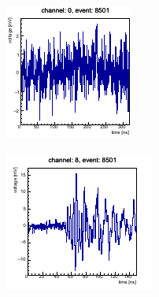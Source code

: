     \begin{figure}[h!]
        \centering
        \begin{subfigure}{.5\textwidth}
        \centering
          \includegraphics[width=.9\textwidth]{pictures/pickup_wave_sipm.pdf}
          \caption{}
          \label{fig:pickup-sipm}
        \end{subfigure}%
        \begin{subfigure}{.5\textwidth}
        \centering
          \includegraphics[width=\textwidth]{pictures/pickup_wave_pmt.pdf}

\end{subfigure}
\end{figure}
